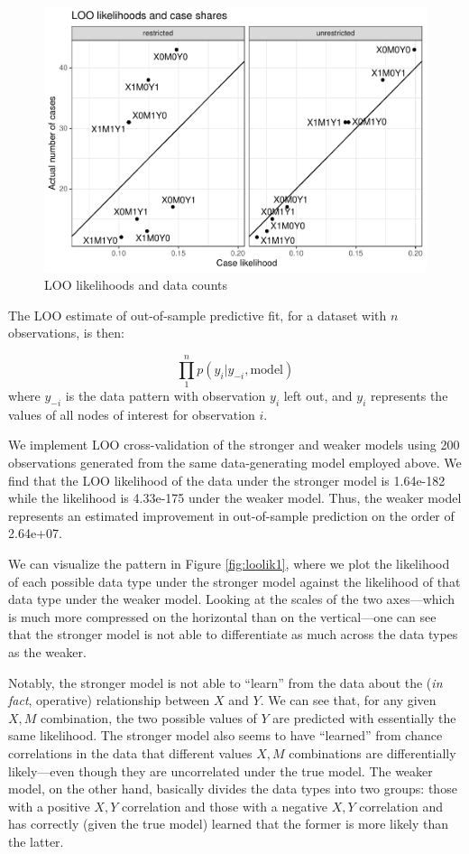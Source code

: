 \documentclass[
  12pt,
]{book}
\begin{document}
\begin{figure}
\centering
\includegraphics{ii_files/figure-latex/loolik2-1.pdf}
\caption{\label{fig:loolik2}LOO likelihoods and data counts}
\end{figure}

The LOO estimate of out-of-sample predictive fit, for a dataset with \(n\) observations, is then:

\[\prod_1^np(y_i|y_{-i}, \text{model})\]
where \(y_{-i}\) is the data pattern with observation \(y_i\) left out, and \(y_i\) represents the values of all nodes of interest for observation \(i\).

We implement LOO cross-validation of the stronger and weaker models using 200 observations generated from the same data-generating model employed above. We find that the LOO likelihood of the data under the stronger model is 1.64e-182 while
the likelihood is 4.33e-175 under the weaker model. Thus, the weaker model represents an estimated improvement in out-of-sample prediction on the order of 2.64e+07.

We can visualize the pattern in Figure \ref{fig:loolik1}, where we plot the likelihood of each possible data type under the stronger model against the likelihood of that data type under the weaker model. Looking at the scales of the two axes---which is much more compressed on the horizontal than on the vertical---one can see that the stronger model is not able to differentiate as much across the data types as the weaker.

Notably, the stronger model is not able to ``learn'' from the data about the (\emph{in fact}, operative) relationship between \(X\) and \(Y\). We can see that, for any given \(X, M\) combination, the two possible values of \(Y\) are predicted with essentially the same likelihood. The stronger model also seems to have ``learned'' from chance correlations in the data that different values \(X,M\) combinations are differentially likely---even though they are uncorrelated under the true model. The weaker model, on the other hand, basically divides the data types into two groups: those with a positive \(X,Y\) correlation and those with a negative \(X,Y\) correlation and has correctly (given the true model) learned that the former is more likely than the latter.
\end{document}
